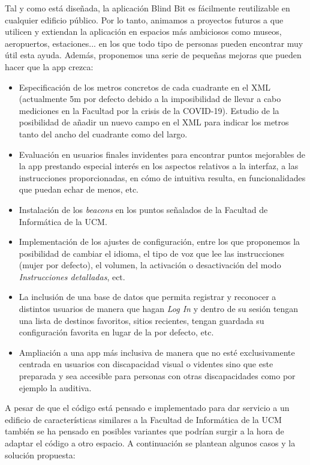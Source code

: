 Tal y como está diseñada, la aplicación Blind Bit es fácilmente reutilizable en cualquier edificio público. Por lo tanto, animamos a proyectos futuros a que utilicen y extiendan la aplicación en espacios más ambiciosos como museos, aeropuertos, estaciones... en los que todo tipo de personas pueden encontrar muy útil esta ayuda. Además, proponemos una serie de pequeñas mejoras que pueden hacer que la app crezca:
\begin{itemize}
	\item Especificación de los metros concretos de cada cuadrante en el XML (actualmente 5m por defecto debido a la imposibilidad de llevar a cabo mediciones en la Facultad por la crisis de la COVID-19). Estudio de la posibilidad de añadir un nuevo campo en el XML para indicar los metros tanto del ancho del cuadrante como del largo.
	\item Evaluación en usuarios finales invidentes para encontrar puntos mejorables de la app prestando especial interés en los aspectos relativos a la interfaz, a las instrucciones proporcionadas, en cómo de intuitiva resulta, en funcionalidades que puedan echar de menos, etc.
	\item Instalación de los \textit{beacons} en los puntos señalados de la Facultad de Informática de la UCM.
	\item Implementación de los ajustes de configuración, entre los que proponemos la posibilidad de cambiar el idioma, el tipo de voz que lee las instrucciones (mujer por defecto), el volumen, la activación o desactivación del modo\textit{ Instrucciones detalladas}, ect. 
	
	\item La inclusión de una base de datos que permita registrar y reconocer a distintos usuarios de manera que hagan \textit{Log In} y dentro de su sesión tengan una lista de destinos favoritos, sitios recientes, tengan guardada su configuración favorita en lugar de la por defecto, etc.
	
	\item Ampliación a una app más inclusiva de manera que no esté exclusivamente centrada en usuarios con discapacidad visual o videntes sino que este preparada y sea accesible para personas con otras discapacidades como por ejemplo la auditiva.
	
\end{itemize}

A pesar de que el código está pensado e implementado para dar servicio a un edificio de características similares a la Facultad de Informática de la UCM también se ha pensado en posibles variantes que podrían surgir a la hora de adaptar el código a otro espacio. A continuación se plantean algunos casos y la solución propuesta: 

